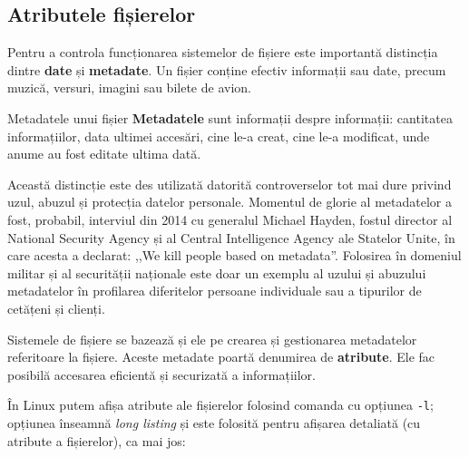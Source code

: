 \subsection{Atributele fișierelor}
\label{sec:file-system-file-attributes}

Pentru a controla funcționarea sistemelor de fișiere este importantă distincția
dintre \textbf{date} și \textbf{metadate}. Un fișier conține efectiv informații sau
date, precum muzică, versuri, imagini sau bilete de avion.

\begin{definition}{Metadatele unui fișier}
\textbf{Metadatele} sunt informații despre informații: cantitatea informațiilor, data
ultimei accesări, cine le-a creat, cine le-a modificat, unde anume au fost
editate ultima dată.
\end{definition}

Această distincție este des utilizată datorită controverselor tot mai dure
privind uzul, abuzul și protecția datelor personale. Momentul de glorie
al metadatelor a fost, probabil, interviul din 2014 cu generalul Michael Hayden,
fostul director al National Security Agency și al Central Intelligence Agency
ale Statelor Unite, în care acesta a declarat: ,,We kill people based on
metadata''. Folosirea în domeniul militar și al securității naționale este
doar un exemplu al uzului și abuzului metadatelor în profilarea diferitelor
persoane individuale sau a tipurilor de cetățeni și clienți.

Sistemele de fișiere se bazează și ele pe crearea și gestionarea metadatelor referitoare la
fișiere. Aceste metadate poartă denumirea de \textbf{atribute}. Ele fac posibilă accesarea
eficientă și securizată a informațiilor.

În Linux putem afișa atribute ale fișierelor folosind comanda  cu opțiunea \texttt{-l}; opțiunea înseamnă \textit{long listing} și este folosită pentru afișarea detaliată (cu atribute a fișierelor), ca mai jos:


